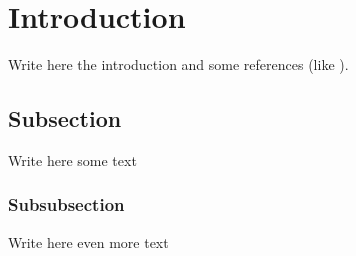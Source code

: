 \section{Introduction}

    Write here the introduction and some references (like \cite{api}
    ).

    \subsection{Subsection}

        Write here some text

        \subsubsection{Subsubsection}

            Write here even more text